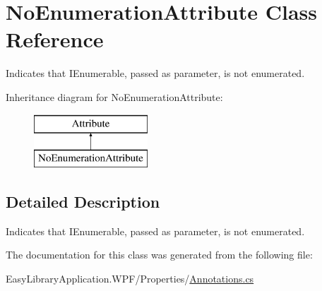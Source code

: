 \hypertarget{class_no_enumeration_attribute}{}\section{No\+Enumeration\+Attribute Class Reference}
\label{class_no_enumeration_attribute}


Indicates that I\+Enumerable, passed as parameter, is not enumerated.  


Inheritance diagram for No\+Enumeration\+Attribute\+:\begin{figure}[H]
\begin{center}
\leavevmode
\includegraphics[height=2.000000cm]{class_no_enumeration_attribute}
\end{center}
\end{figure}


\subsection{Detailed Description}
Indicates that I\+Enumerable, passed as parameter, is not enumerated. 



The documentation for this class was generated from the following file\+:\begin{DoxyCompactItemize}
\item 
Easy\+Library\+Application.\+W\+P\+F/\+Properties/\mbox{\hyperlink{_annotations_8cs}{Annotations.\+cs}}\end{DoxyCompactItemize}
